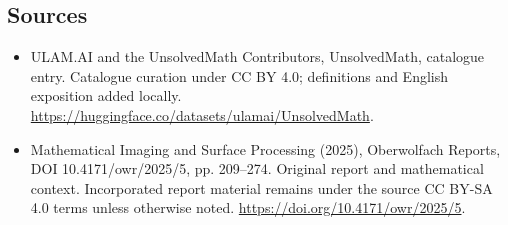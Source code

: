 \documentclass[11pt]{article}
\begin{document}
\subsection{Sources}
\begin{itemize}
\item[\hypertarget{source:statement:1}{S1}] ULAM.AI and the UnsolvedMath Contributors, UnsolvedMath, catalogue entry. Catalogue curation under CC BY 4.0; definitions and English exposition added locally.
\url{https://huggingface.co/datasets/ulamai/UnsolvedMath}.
\item[\hypertarget{source:statement:2}{S2}] Mathematical Imaging and Surface Processing (2025), Oberwolfach Reports, DOI 10.4171/owr/2025/5, pp. 209--274. Original report and mathematical context. Incorporated report material remains under the source CC BY-SA 4.0 terms unless otherwise noted.
\url{https://doi.org/10.4171/owr/2025/5}.
\end{itemize}
\label{end:statement}
\end{document}
